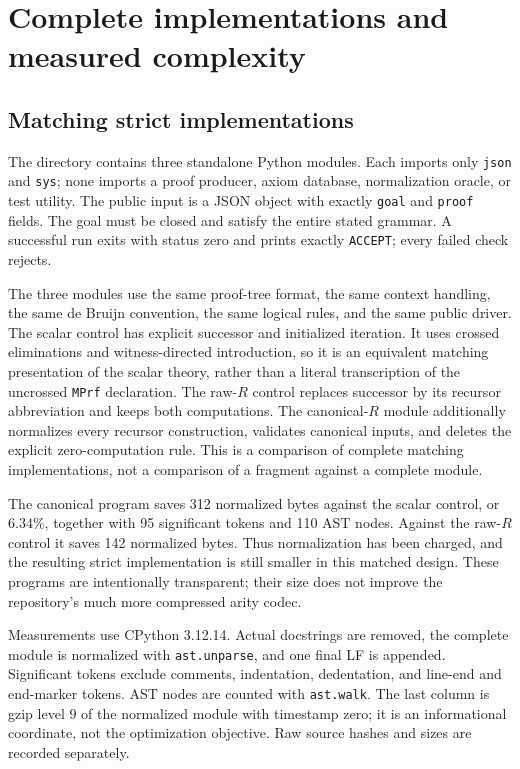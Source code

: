 \section{Complete implementations and measured complexity}
\label{sec:implementation}

\subsection{Matching strict implementations}

The directory  contains three standalone Python modules.
Each imports only \texttt{json} and \texttt{sys}; none imports a proof
producer, axiom database, normalization oracle, or test utility. The public
input is a JSON object with exactly \texttt{goal} and \texttt{proof} fields.
The goal must be closed and satisfy the entire stated grammar. A successful
run exits with status zero and prints exactly \texttt{ACCEPT}; every failed
check rejects.

The three modules use the same proof-tree format, the same context handling,
the same de Bruijn convention, the same logical rules, and the same public
driver. The scalar control has explicit successor and initialized iteration.
It uses crossed eliminations and witness-directed introduction, so it is an
equivalent matching presentation of the scalar theory, rather than a literal
transcription of the uncrossed \texttt{MPrf} declaration.
The raw-$R$ control replaces successor by its recursor abbreviation and keeps
both computations. The canonical-$R$ module additionally normalizes every
recursor construction, validates canonical inputs, and deletes the explicit
zero-computation rule. This is a comparison of complete matching
implementations, not a comparison of a fragment against a complete module.



The canonical program saves 312 normalized bytes against the scalar control,
or $6.34\%$, together with 95 significant tokens and 110 AST nodes. Against
the raw-$R$ control it saves 142 normalized bytes. Thus normalization has
been charged, and the resulting strict implementation is still smaller in
this matched design. These programs are intentionally transparent; their
size does not improve the repository's much more compressed arity codec.

Measurements use CPython 3.12.14. Actual docstrings are removed, the complete
module is normalized with \texttt{ast.unparse}, and one final LF is appended.
Significant tokens exclude comments, indentation, dedentation, and line-end
and end-marker tokens. AST nodes are counted with \texttt{ast.walk}.
The last column is gzip level 9 of the normalized module with timestamp zero;
it is an informational coordinate, not the optimization objective. Raw
source hashes and sizes are recorded separately.

